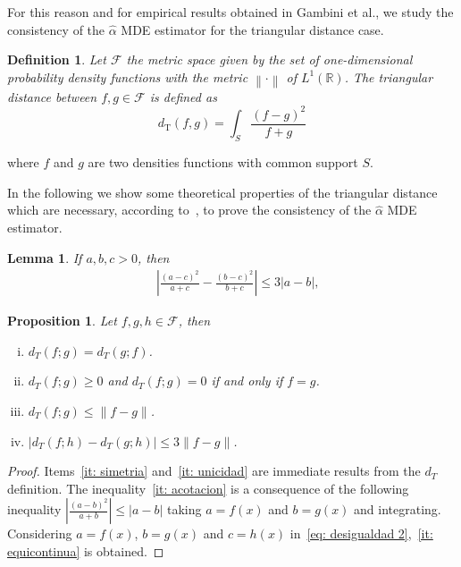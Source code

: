 \documentclass[journal]{IEEEtran}
\newtheorem{definition}{Definition}
\newtheorem{proposition}{Proposition}
\numberwithin{equation}{section}
\newtheorem{lemma}{Lemma}[section]
\newenvironment{dem}[1][Proof]{\begin{proof}[{\it #1}]}{\end{proof}}
\newcommand{\al}{&\,}
\newcommand{\R}{\ensuremath{\mathbb{R}}}
\newcommand{\abs}[1]{\ensuremath{\left| #1 \right|}}
\newcommand{\norm}[1]{\ensuremath{\left\| #1 \right\|}}
\newcommand{\pa}[1]{\ensuremath{\left( #1 \right)}}
\begin{document}
For this reason and for empirical results obtained in Gambini et al., we study the consistency of the $\widehat{\alpha}$ MDE estimator for the triangular distance case.

\vspace{0.2cm} 
\begin{definition}
	Let $\mathcal{F}$ the metric space given by the set of one-dimensional probability density functions with the metric $\norm{\cdot}$ of $L^{1}\pa{\R}$.
	The triangular distance between $f,g\in\mathcal{F}$ is defined as
	\begin{equation}
	d_{\text{T}}(f,g)=\int_{S}\frac{(f-g)^2}{f+g} 
	\label{DT}
	\end{equation}
\end{definition}
where $f$ and $g$ are two densities functions with common support $S$. 


In the following we show some theoretical properties of the triangular distance which are necessary, according to~\cite{parr1982}, to prove the consistency of the $\widehat{\alpha}$ MDE estimator.

\begin{lemma}
	If $a,b,c>0$, then
	\begin{subequations}
		\begin{align}
		\label{eq: desigualdad 2}
		\al \abs{\frac{\pa{a-c}^{2}}{a+c} - \frac{\pa{b-c}^{2}}{b+c}} \le 3 \abs{a-b},
		\end{align}
	\end{subequations}
\end{lemma}

\begin{proposition}
	Let $f,g,h\in\mathcal{F}$, then
	\begin{enumerate}[i.]
		\item\label{it: simetria} $d_{T}\pa{f;g} = d_{T}\pa{g;f}$.
		\item\label{it: unicidad} $d_{T}\pa{f;g} \ge 0$ and $d_{T}\pa{f;g} = 0$ if and only if $f = g$.
		\item\label{it: acotacion} $d_{T}\pa{f;g} \le \norm{f-g}$.
		\item\label{it: equicontinua} $\abs{d_{T}\pa{f;h}-d_{T}\pa{g;h}} \le 3 \norm{f-g}$.
	\end{enumerate}
\end{proposition}

\begin{dem}
	Items~\eqref{it: simetria} and~\eqref{it: unicidad} are immediate results from the $d_{T}$ definition.
	The inequality~\eqref{it: acotacion} is a consequence of the following inequality $\abs{\frac{\pa{a-b}^{2}}{a+b}} \le \abs{a-b}$ taking $a = f\pa{x}$ and $b = g\pa{x}$ and integrating.
	Considering $a = f\pa{x}$, $b = g\pa{x}$ and $c = h\pa{x}$ in~\eqref{eq: desigualdad 2},~\eqref{it: equicontinua} is obtained.
\end{dem}
\end{document}
